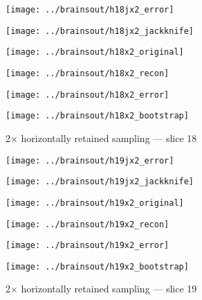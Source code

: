 \documentclass[review,supplement,onefignum,onetabnum,juq]{siamonline181217}
\begin{document}
\begin{figure}
\begin{centering}

\parbox{\imsize}{\texttt{[image: ../brainsout/h18jx2\_error]}}
\parbox{\imsize}{\texttt{[image: ../brainsout/h18jx2\_jackknife]}}

\vspace{\vertsep}

\parbox{\imsize}{\texttt{[image: ../brainsout/h18x2\_original]}}
\parbox{\imsize}{\texttt{[image: ../brainsout/h18x2\_recon]}}

\vspace{\vertsep}

\parbox{\imsize}{\texttt{[image: ../brainsout/h18x2\_error]}}
\parbox{\imsize}{\texttt{[image: ../brainsout/h18x2\_bootstrap]}}

\end{centering}
\caption{2$\times$ horizontally retained sampling --- slice 18}
\end{figure}


\begin{figure}
\begin{centering}

\parbox{\imsize}{\texttt{[image: ../brainsout/h19jx2\_error]}}
\parbox{\imsize}{\texttt{[image: ../brainsout/h19jx2\_jackknife]}}

\vspace{\vertsep}

\parbox{\imsize}{\texttt{[image: ../brainsout/h19x2\_original]}}
\parbox{\imsize}{\texttt{[image: ../brainsout/h19x2\_recon]}}

\vspace{\vertsep}

\parbox{\imsize}{\texttt{[image: ../brainsout/h19x2\_error]}}
\parbox{\imsize}{\texttt{[image: ../brainsout/h19x2\_bootstrap]}}

\end{centering}
\caption{2$\times$ horizontally retained sampling --- slice 19}
\end{figure}
\end{document}
